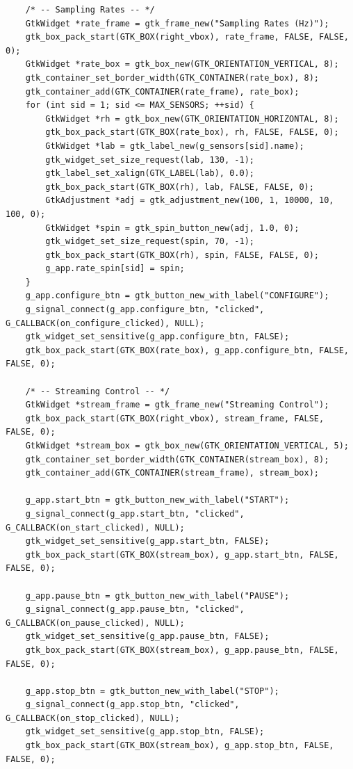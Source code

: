 \begin{verbatim}
    /* -- Sampling Rates -- */
    GtkWidget *rate_frame = gtk_frame_new("Sampling Rates (Hz)");
    gtk_box_pack_start(GTK_BOX(right_vbox), rate_frame, FALSE, FALSE, 0);
    GtkWidget *rate_box = gtk_box_new(GTK_ORIENTATION_VERTICAL, 8);
    gtk_container_set_border_width(GTK_CONTAINER(rate_box), 8);
    gtk_container_add(GTK_CONTAINER(rate_frame), rate_box);
    for (int sid = 1; sid <= MAX_SENSORS; ++sid) {
        GtkWidget *rh = gtk_box_new(GTK_ORIENTATION_HORIZONTAL, 8);
        gtk_box_pack_start(GTK_BOX(rate_box), rh, FALSE, FALSE, 0);
        GtkWidget *lab = gtk_label_new(g_sensors[sid].name);
        gtk_widget_set_size_request(lab, 130, -1);
        gtk_label_set_xalign(GTK_LABEL(lab), 0.0);
        gtk_box_pack_start(GTK_BOX(rh), lab, FALSE, FALSE, 0);
        GtkAdjustment *adj = gtk_adjustment_new(100, 1, 10000, 10, 100, 0);
        GtkWidget *spin = gtk_spin_button_new(adj, 1.0, 0);
        gtk_widget_set_size_request(spin, 70, -1);
        gtk_box_pack_start(GTK_BOX(rh), spin, FALSE, FALSE, 0);
        g_app.rate_spin[sid] = spin;
    }
    g_app.configure_btn = gtk_button_new_with_label("CONFIGURE");
    g_signal_connect(g_app.configure_btn, "clicked", G_CALLBACK(on_configure_clicked), NULL);
    gtk_widget_set_sensitive(g_app.configure_btn, FALSE);
    gtk_box_pack_start(GTK_BOX(rate_box), g_app.configure_btn, FALSE, FALSE, 0);

    /* -- Streaming Control -- */
    GtkWidget *stream_frame = gtk_frame_new("Streaming Control");
    gtk_box_pack_start(GTK_BOX(right_vbox), stream_frame, FALSE, FALSE, 0);
    GtkWidget *stream_box = gtk_box_new(GTK_ORIENTATION_VERTICAL, 5);
    gtk_container_set_border_width(GTK_CONTAINER(stream_box), 8);
    gtk_container_add(GTK_CONTAINER(stream_frame), stream_box);

    g_app.start_btn = gtk_button_new_with_label("START");
    g_signal_connect(g_app.start_btn, "clicked", G_CALLBACK(on_start_clicked), NULL);
    gtk_widget_set_sensitive(g_app.start_btn, FALSE);
    gtk_box_pack_start(GTK_BOX(stream_box), g_app.start_btn, FALSE, FALSE, 0);

    g_app.pause_btn = gtk_button_new_with_label("PAUSE");
    g_signal_connect(g_app.pause_btn, "clicked", G_CALLBACK(on_pause_clicked), NULL);
    gtk_widget_set_sensitive(g_app.pause_btn, FALSE);
    gtk_box_pack_start(GTK_BOX(stream_box), g_app.pause_btn, FALSE, FALSE, 0);

    g_app.stop_btn = gtk_button_new_with_label("STOP");
    g_signal_connect(g_app.stop_btn, "clicked", G_CALLBACK(on_stop_clicked), NULL);
    gtk_widget_set_sensitive(g_app.stop_btn, FALSE);
    gtk_box_pack_start(GTK_BOX(stream_box), g_app.stop_btn, FALSE, FALSE, 0);


\end{verbatim}
